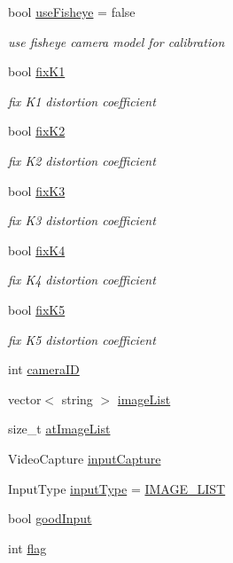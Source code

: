 \begin{DoxyCompactItemize}
bool \mbox{\hyperlink{class_settings_ac8f271630d54f9d0c718ea0130972d44}{use\+Fisheye}} = false
\begin{DoxyCompactList}\small\item\em use fisheye camera model for calibration \end{DoxyCompactList}\item 
bool \mbox{\hyperlink{class_settings_a25242813ee2c5e111ce48fe1f7f85e7b}{fix\+K1}}
\begin{DoxyCompactList}\small\item\em fix K1 distortion coefficient \end{DoxyCompactList}\item 
bool \mbox{\hyperlink{class_settings_abad0b643dc5a39d493a6343d38f41578}{fix\+K2}}
\begin{DoxyCompactList}\small\item\em fix K2 distortion coefficient \end{DoxyCompactList}\item 
bool \mbox{\hyperlink{class_settings_a433fca3c377d42f1c7d43e35a286913f}{fix\+K3}}
\begin{DoxyCompactList}\small\item\em fix K3 distortion coefficient \end{DoxyCompactList}\item 
bool \mbox{\hyperlink{class_settings_ac993998a56cebe0593cb74fe39858d31}{fix\+K4}}
\begin{DoxyCompactList}\small\item\em fix K4 distortion coefficient \end{DoxyCompactList}\item 
bool \mbox{\hyperlink{class_settings_a4d0d37eef5f3033a8aabc3f09ee29a03}{fix\+K5}}
\begin{DoxyCompactList}\small\item\em fix K5 distortion coefficient \end{DoxyCompactList}\item 
int \mbox{\hyperlink{class_settings_af32a5ff06192bde106c934e0361bcd7e}{camera\+ID}}
\item 
vector$<$ string $>$ \mbox{\hyperlink{class_settings_ae261128a69d1d3d2b0f5315aff8066c8}{image\+List}}
\item 
size\+\_\+t \mbox{\hyperlink{class_settings_a1b89e85a2638e19f2d53269245d19b66}{at\+Image\+List}}
\item 
Video\+Capture \mbox{\hyperlink{class_settings_abd5706146b34d3c32aef4025dcd2ec1b}{input\+Capture}}
\item 
Input\+Type \mbox{\hyperlink{class_settings_a89fb14ce9856fb642f18bb0f7c5b8868}{input\+Type}} = \mbox{\hyperlink{class_settings_a04fa2d41ea944f16221959d0d49858e9a292bd2e5ba912a92ace1606e366edc4d}{I\+M\+A\+G\+E\+\_\+\+L\+I\+ST}}
\item 
bool \mbox{\hyperlink{class_settings_a3b9fc27b555f982bd5b9ea5198e1f7e3}{good\+Input}}
\item 
int \mbox{\hyperlink{class_settings_aba5691e3e76525f93ea254e654ec3717}{flag}}
\end{DoxyCompactItemize}


